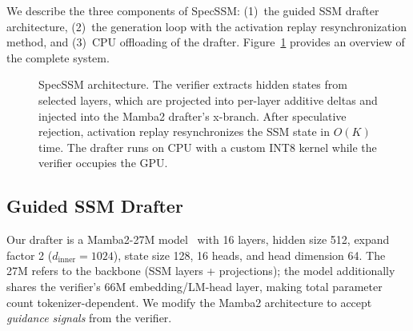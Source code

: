 We describe the three components of SpecSSM: (1)~the guided SSM drafter architecture, (2)~the generation loop with the activation replay resynchronization method, and (3)~CPU offloading of the drafter.
Figure~\ref{fig:architecture} provides an overview of the complete system.

\begin{figure}[t]
  \centering
  \caption{SpecSSM architecture. The verifier extracts hidden states from selected layers, which are projected into per-layer additive deltas and injected into the Mamba2 drafter's x-branch. After speculative rejection, activation replay resynchronizes the SSM state in $O(K)$ time. The drafter runs on CPU with a custom INT8 kernel while the verifier occupies the GPU.}
  \label{fig:architecture}
\end{figure}

\subsection{Guided SSM Drafter}
\label{sec:guided}

Our drafter is a Mamba2-27M model~\citep{dao2024transformers} with 16 layers, hidden size 512, expand factor 2 ($d_{\mathrm{inner}}=1024$), state size 128, 16 heads, and head dimension 64.
The 27M refers to the backbone (SSM layers + projections); the model additionally shares the verifier's 66M embedding/LM-head layer, making total parameter count tokenizer-dependent.
We modify the Mamba2 architecture to accept \emph{guidance signals} from the verifier.

